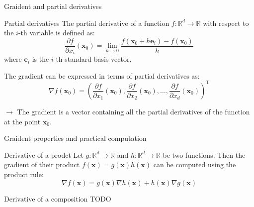 \documentclass[aspectratio=1610]{beamer}
\begin{document}
\begin{frame}{Graident and partial derivatives}

  \begin{block}{Partial derivatives}
    The partial derivative of a function $f:\mathbb{R}^d \to \mathbb{R}$ with respect to the $i$-th variable is defined as:
    $$\frac{\partial f}{\partial x_i}(\mathbf{x}_0) = \lim_{h \to 0} \frac{f(\mathbf{x}_0 + h\mathbf{e}_i) - f(\mathbf{x}_0)}{h}$$
    where $\mathbf{e}_i$ is the $i$-th standard basis vector.
  \end{block}

  The gradient can be expressed in terms of partial derivatives as:
  $$\nabla f(\mathbf{x}_0) = \left( \frac{\partial f}{\partial x_1}(\mathbf{x}_0), \frac{\partial f}{\partial x_2}(\mathbf{x}_0), \ldots, \frac{\partial f}{\partial x_d}(\mathbf{x}_0) \right)^\mathrm{T}$$

  $\rightarrow$ The gradient is a vector containing all the partial derivatives of the function at the point $\mathbf{x}_0$.
\end{frame}


\begin{frame}{Graident properties and practical computation}

  \begin{block}{Derivative of a prodct}
    Let $g:\mathbb{R}^d \to \mathbb{R}$ and $h:\mathbb{R}^d \to \mathbb{R}$ be two functions. Then the gradient of their product $f(\mathbf{x}) = g(\mathbf{x})h(\mathbf{x})$ can be computed using the product rule:
    $$\nabla f(\mathbf{x}) = g(\mathbf{x})\nabla h(\mathbf{x}) + h(\mathbf{x})\nabla g(\mathbf{x})$$
  \end{block}

  \begin{block}{Derivative of a composition}
    TODO
  \end{block}
\end{frame}
\end{document}
